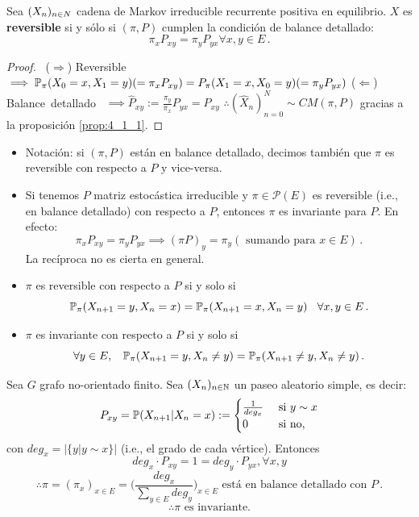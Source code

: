 \begin{proposition}
Sea $\xcm$ cadena de Markov irreducible recurrente positiva en equilibrio. $X$ es \textbf{reversible} si y sólo si $(\pi,P)$ cumplen la condición de balance detallado:
$$ \pi_xP_{xy}=\pi_yP_{yx}\forall x,y\in E\, .$$
\end{proposition}
\begin{proof}
\gris
\mbox{ }\newline ($\Rightarrow$) Reversible $\implies \P_\pi(X_0=x,X_1=y)(=\pi_xP_{xy})=P_\pi(X_1=x,X_0=y)(=\pi_yP_{yx})$
\newline ($\Leftarrow$) \mbox{Balance detallado } $\implies \hat{P}_{xy}:=\displaystyle\frac{\pi_y}{\pi_x}P_{yx}=P_{xy}$
\newline $\therefore (\hat{X}_n)_{n=0}^N\sim CM(\pi,P)$ gracias a la proposición \ref{prop:4_1_1}. \findem
\negro
\end{proof}
\begin{remark}
\beforeitemize
\begin{itemize}
    \item Notación: si $(\pi,P)$ están en balance detallado, decimos también que $\pi$ es reversible con respecto a $P$ y vice-versa.
    \item Si tenemos $P$ matriz estocástica irreducible y $\pi\in\mathcal{P}(E)$ es reversible (i.e., en balance detallado) con respecto a $P$,  entonces $\pi$ es invariante para $P$. En efecto: 
    $$ \pi_xP_{xy}=\pi_yP_{yx}\implies (\pi P)_y=\pi_y (\mbox{ sumando para }x\in E)\, .$$
    La recíproca no es cierta en general.
    \item $\pi$ es reversible con respecto a $P$ si y solo si  $$\P_\pi(X_{n+1}=y,X_n=x)=\P_\pi(X_{n+1}=x,X_n=y)\espacio \forall x, y \in E \,.$$
    \item $\pi$ es invariante con respecto a $P$ si y solo si %
    $$\forall y \in E,\espacio \P_\pi(X_{n+1}=y,X_n\neq y)=\P_\pi(X_{n+1}\neq y,X_n\neq y)\,.$$
\end{itemize}
\end{remark}
\begin{example}
Sea $G$ grafo no-orientado finito. Sea $(X_n)_{n\in\N}$ un paseo aleatorio simple, es decir: 
$$ P_{xy}=\P(X_{n+1}|X_n=x):=\begin{cases}
\frac{1}{deg_x}   & \mbox{ si }y\sim x\\
0   & \mbox{ si no,}
\end{cases}$$
con $deg_x=|\{y|y\sim x\}|$ (i.e., el grado de cada vértice). Entonces
$$ deg_x\cdot P_{xy}=1=deg_y \cdot P_{yx}, \forall x,y$$
$$ \therefore \pi=(\pi_x)_{x\in E}=\displaystyle\bigg(\frac{deg_x}{\sum_{y\in E}deg_y}\bigg)_{x\in E} \mbox{ está en balance detallado con }P \, .$$
$$ \therefore \pi \mbox{ es invariante.}$$
\end{example}
